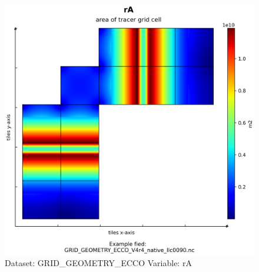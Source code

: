 \begin{figure}[H]
\centering
\includegraphics[width=\textwidth]{../images/plots/native_plots_coords/Geometry_Parameters_for_the_Lat-Lon-Cap_90_(llc90)_Native_Model_Grid_(Version_4_Release_4)/rA.png}
\caption{Dataset: GRID\_GEOMETRY\_ECCO Variable: rA}
\label{tab:table-GRID_GEOMETRY_ECCO_rA-Plot}
\end{figure}
\pagebreak
